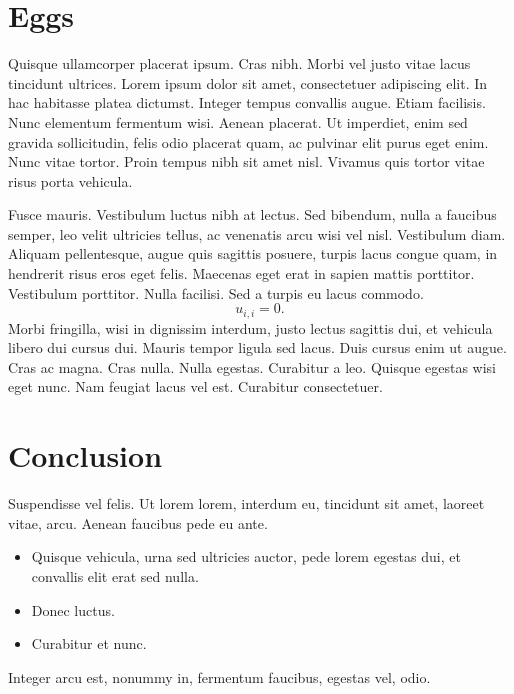 \documentclass{tudelftposter}
\begin{document}
\section{Eggs}

Quisque ullamcorper placerat ipsum. Cras nibh.  Morbi vel justo vitae lacus
tincidunt ultrices. Lorem ipsum dolor sit amet, consectetuer adipiscing elit. In
hac habitasse platea dictumst. Integer tempus convallis augue. Etiam facilisis.
Nunc elementum fermentum wisi. Aenean placerat. Ut imperdiet, enim sed gravida
sollicitudin, felis odio placerat quam, ac pulvinar elit purus eget enim. Nunc
vitae tortor. Proin tempus nibh sit amet nisl.  Vivamus quis tortor vitae risus
porta vehicula.


Fusce mauris. Vestibulum luctus nibh at lectus.  Sed bibendum, nulla a faucibus
semper, leo velit ultricies tellus, ac venenatis arcu wisi vel nisl. Vestibulum
diam. Aliquam pellentesque, augue quis sagittis posuere, turpis lacus congue
quam, in hendrerit risus eros eget felis. Maecenas eget erat in sapien mattis
porttitor. Vestibulum porttitor. Nulla facilisi. Sed a turpis eu lacus commodo.
\begin{equation}
  u_{i,i} = 0.
\end{equation}
Morbi fringilla, wisi in dignissim interdum, justo lectus sagittis
dui, et vehicula libero dui cursus dui. Mauris tempor ligula sed lacus. Duis
cursus enim ut augue. Cras ac magna. Cras nulla. Nulla egestas. Curabitur a leo.
Quisque egestas wisi eget nunc. Nam feugiat lacus vel est. Curabitur
consectetuer.

\section{Conclusion}

Suspendisse vel felis. Ut lorem lorem, interdum eu, tincidunt sit amet, laoreet
vitae, arcu. Aenean faucibus pede eu ante.
\begin{itemize}
  \item Quisque vehicula, urna sed ultricies auctor, pede lorem egestas dui, et
  convallis elit erat sed nulla.
  \item Donec luctus.
  \item Curabitur et nunc.
\end{itemize}
Integer arcu est, nonummy in, fermentum faucibus, egestas vel, odio.
\end{document}
